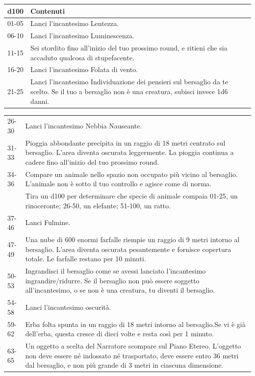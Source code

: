 \begin{multicols}{2}
\noindent\begin{tabularx}{0.50\textwidth}{lX}
\textbf{d100}& \textbf{Contenuti}\\
\hline
01-05 &Lanci l'incantesimo Lentezza.\\
06-10 &Lanci l'incantesimo Luminescenza.\\
11-15 &Sei stordito fino all'inizio del tuo prossimo round, e ritieni che sia accaduto qualcosa di stupefacente.\\
16-20 &Lanci l'incantesimo Folata di vento.\\
21-25 &Lanci l'incantesimo Individuazione dei pensieri sul bersaglio da te scelto. Se il tuo a bersaglio non è una creatura, subisci invece 1d6 danni.\\
\end{tabularx}
\noindent\begin{tabularx}{0.50\textwidth}{lX}
26-30 &Lanci l'incantesimo Nebbia Nauseante.\\
31-33 &Pioggia abbondante precipita in un raggio di 18 metri centrato sul bersaglio. L'area diventa oscurata leggermente. La pioggia continua a cadere fino all'inizio del tuo prossimo round.\\
34-36 &Compare un animale nello spazio non occupato più vicino al bersaglio. L'animale non è sotto il tuo controllo e agisce come di norma. \\
&Tira un d100 per determinare che specie di animale compaia 01-25, un rinoceronte; 26-50, un elefante; 51-100, un ratto.\\
37-46 &Lanci Fulmine.\\
47-49 &Una nube di 600 enormi farfalle riempie un raggio di 9 metri intorno al bersaglio. L'area diventa oscurata pesantemente e fornisce copertura totale. Le farfalle restano per 10 minuti.\\
50-53 &Ingrandisci il bersaglio come se avessi lanciato l'incantesimo ingrandire/ridurre. Se il bersaglio non può essere soggetto all'incantesimo, o se non è una creatura, tu diventi il bersaglio.\\
54-58 &Lanci l'incantesimo oscurità.\\
59-62 &Erba folta spunta in un raggio di 18 metri intorno al bersaglio.Se vi è già dell'erba, questa cresce di dieci volte e resta così per 1 minuto.\\
63-65 &Un oggetto a scelta del Narratore scompare sul Piano Etereo. L'oggetto non deve essere né indossato né trasportato, deve essere entro 36 metri dal bersaglio, e non più grande di 3 metri in ciascuna dimensione.\\

\end{tabularx}
\end{multicols}
